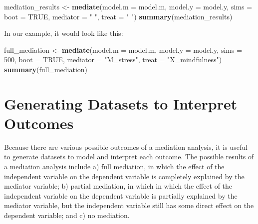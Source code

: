 \documentclass[]{book}
\newenvironment{Shaded}{\begin{snugshade}}{\end{snugshade}}
\newcommand{\DataTypeTok}[1]{\textcolor[rgb]{0.13,0.29,0.53}{#1}}
\newcommand{\DecValTok}[1]{\textcolor[rgb]{0.00,0.00,0.81}{#1}}
\newcommand{\KeywordTok}[1]{\textcolor[rgb]{0.13,0.29,0.53}{\textbf{#1}}}
\newcommand{\NormalTok}[1]{#1}
\newcommand{\OtherTok}[1]{\textcolor[rgb]{0.56,0.35,0.01}{#1}}
\newcommand{\StringTok}[1]{\textcolor[rgb]{0.31,0.60,0.02}{#1}}
\begin{document}
\begin{Shaded}
\begin{Highlighting}[]
\NormalTok{mediation_results <-}\StringTok{ }\KeywordTok{mediate}\NormalTok{(}\DataTypeTok{model.m =}\NormalTok{ model.m,}
                       \DataTypeTok{model.y =}\NormalTok{ model.y,}
                       \DataTypeTok{sims =} 
                       \DataTypeTok{boot =} \OtherTok{TRUE}\NormalTok{,}
                       \DataTypeTok{mediator =} \StringTok{"  "}\NormalTok{,}
                       \DataTypeTok{treat =} \StringTok{"  "}\NormalTok{)}
\KeywordTok{summary}\NormalTok{(mediation_results)}
\end{Highlighting}
\end{Shaded}

In our example, it would look like this:

\begin{Shaded}
\begin{Highlighting}[]
\NormalTok{full_mediation <-}\StringTok{ }\KeywordTok{mediate}\NormalTok{(}\DataTypeTok{model.m =}\NormalTok{ model.m,}
                       \DataTypeTok{model.y =}\NormalTok{ model.y,}
                       \DataTypeTok{sims =} \DecValTok{500}\NormalTok{,}
                       \DataTypeTok{boot =} \OtherTok{TRUE}\NormalTok{,}
                       \DataTypeTok{mediator =} \StringTok{"M_stress"}\NormalTok{,}
                       \DataTypeTok{treat =} \StringTok{"X_mindfulness"}\NormalTok{)}
\KeywordTok{summary}\NormalTok{(full_mediation)}
\end{Highlighting}
\end{Shaded}

\hypertarget{generating-datasets-to-interpret-outcomes}{%
\section{Generating Datasets to Interpret Outcomes}\label{generating-datasets-to-interpret-outcomes}}

Because there are various possible outcomes of a mediation analysis, it is useful to generate datasets to model and interpret each outcome. The possible results of a mediation analysis include a) full mediation, in which the effect of the independent variable on the dependent variable is completely explained by the mediator variable; b) partial mediation, in which in which the effect of the independent variable on the dependent variable is partially explained by the mediator variable, but the independent variable still has some direct effect on the dependent variable; and c) no mediation.
\end{document}
